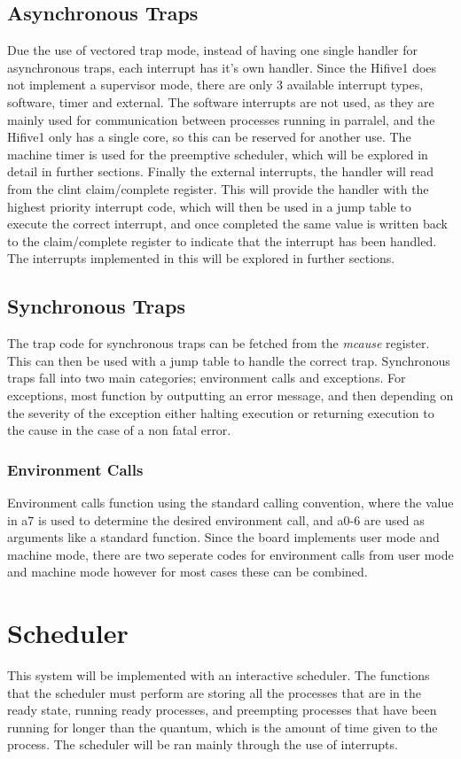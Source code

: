 \subsection{Asynchronous Traps}
Due the use of vectored trap mode, instead of having one single handler for asynchronous traps, each interrupt has it's own handler. Since the Hifive1 does not implement a supervisor mode, there are only 3 available interrupt types, software, timer and external. The software interrupts are not used, as they are mainly used for communication between processes running in parralel, and the Hifive1 only has a single core, so this can be reserved for another use. The machine timer is used for the preemptive scheduler, which will be explored in detail in further sections. Finally the external interrupts, the handler will read from the \ac{clint} claim/complete register. This will provide the handler with the highest priority interrupt code, which will then be used in a jump table to execute the correct interrupt, and once completed the same value is written back to the claim/complete register to indicate that the interrupt has been handled. The interrupts implemented in this will be explored in further sections.
\subsection{Synchronous Traps}
The trap code for synchronous traps can be fetched from the \textit{mcause} register. This can then be used with a jump table to handle the correct trap. Synchronous traps fall into two main categories; environment calls and exceptions. For exceptions, most function by outputting an error message, and then depending on the severity of the exception either halting execution or returning execution to the cause in the case of a non fatal error.
\subsubsection{Environment Calls}
Environment calls function using the standard calling convention, where the value in a7 is used to determine the desired environment call, and a0-6 are used as arguments like a standard function. Since the board implements user mode and machine mode, there are two seperate codes for environment calls from user mode and machine mode however for most cases these can be combined.
\section{Scheduler}
This system will be implemented with an interactive scheduler. The functions that the scheduler must perform are storing all the processes that are in the ready state, running ready processes, and preempting processes that have been running for longer than the quantum, which is the amount of time given to the process. The scheduler will be ran mainly through the use of interrupts.
